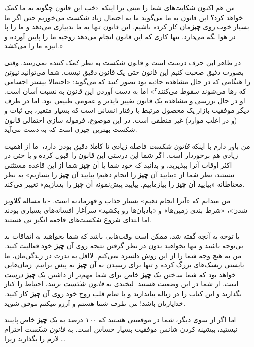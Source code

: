 من هم اکنون شکایت‌های شما را مبنی برا اینکه «خب این قانون چگونه به ما
کمک خواهد کرد؟ این قانون به ما می‌گوید ما به احتمال زیاد شکست می‌خوریم
حتی اگر ما بسیار خوب روی \textbf{چیز}مان کار کرده باشیم. این قانون تنها
به ما بدبیاری می‌دهد و ما را پا در هوا نگه می‌دارد. تنها کاری که این
قانون انجام می‌دهد روحیه ما را پایین آورده و انیزه ما را می‌کشد.»

در ظاهر این حرف درست است و قانون شکست به نظر کمک کننده نمی‌رسد. وقتی
بصورت دقیق صحبت کنیم این قانون حتی یک قانون دقیق نیست. شما می‌توانید
نیوتن را هنگامی که در حال مشاهده جاذبه بود تصور کنید که می‌گوید:
«احتمالا بیشتر اجسامی که رها می‌شوند سقوط می‌کنند؟» اما به دست آوردن این
قانون به نسبت آسان است. او در حال بررسی و مشاهده یک قانون تغییر ناپذیر و
عمومی طبیعی بود. اما در طرف دیگر موفقیت بازار یک محصول مرتبط با رفتار
انسانی است که بسیار متغیر، بی ثبات و (و در اغلب موارد) غیر منطقی است. در
این موضوع، فرموله سازی احتمالی قانون شکست بهترین چیزی است که به دست
می‌آید.

من باور دارم با اینکه \emph{قانون شکست} فاصله زیادی تا کاملا دقیق بودن
دارد، اما از اهمیت زیادی هم برخوردار است. اگر شما این درستی این قانون را
قبول کرده و یا حتی در اکثر اوقات آنرا بپذیرید، و بدانید که خود شما یا آن
\textbf{چیز} شما از این قاعده مستثنی نیستند، نظر شما از «بیایید آن
\textbf{چیز} را انجام دهیم! بیایید آن \textbf{چیز} را بسازیم» به نظر
محتاطانه «بیایید آن \textbf{چیز} را بیازماییم. بیایید پیش‌نمونه آن
\textbf{چیز} را بسازیم» تغییر می‌کند.

من میدانم که «آنرا انجام دهیم» بسیار حذاب و قهرمانانه است. «با مساله
گلاویز شدن»، «شرط بندی زمین‌ها» و «بادبان‌ها رو بکشید» سرآغاز افسانه‌های
بسیاری بودند اما ابتدای شروع شکست‌های فاجعه انگیز نی هستند.

با توجه به آنچه گفته شد، ممکن است وقت‌هایی باشد که شما بخواهید به
اتفاقات بد بی‌توجه باشید و تنها بخواهید بدون در نظر گرفتن نتیجه روی آن
\textbf{چیز} خود فعالیت کنید. من به هیچ وجه شما را از این روش دلسرد
نمی‌کنم. لااقل به ندرت در زندگی‌مان، ما بایستی ریسک‌های بزرگ کرده و تنها
برای رسیدن به آن \textbf{چیز} به پیش برانیم. زمان‌هایی خواهد بود که شما
ساختن یک \textbf{چیز} خاص برای شما مهم‌تر از داشتن یک \textbf{چیز}
\emph{درست} است. ار شما در این وضعیت هستید، لبخندی به \emph{قانون شکست}
بزنید، احتیاط را کنار بگذارید و این کتاب را در زباله بیاندازید و با تمام
قلب روح خود روی آن \textbf{چیز} کار کنید. خدایارتان باشد! من طرف شما
هستم و آرزو میکنم موفق شوید.

اما اگر از سوی دیگر، شما در موقعیتی هستید که ۱۰۰ درصد به یک \textbf{چیز}
خاص پایبند نیستید، بیشینه کردن شانس موفقیت بسیار حساس است. به
\emph{قانون شکست} احترام لازم را بگذارید زیرا \ldots{}

